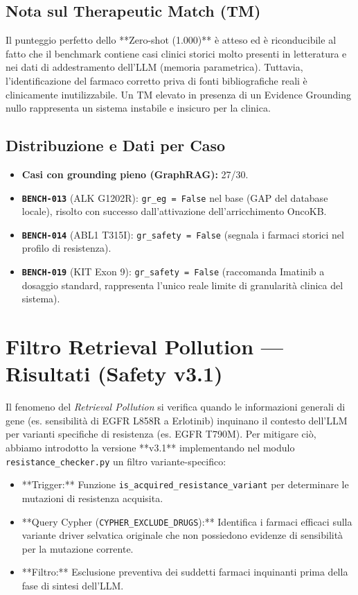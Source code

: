 \documentclass[12pt, a4paper]{article}
\newcommand{\bench}[1]{{\texttt{\textbf{#1}}}}
\begin{document}
\subsection{Nota sul Therapeutic Match (TM)}
Il punteggio perfetto dello **Zero-shot (1.000)** è atteso ed è riconducibile al fatto che il benchmark contiene casi clinici storici molto presenti in letteratura e nei dati di addestramento dell'LLM (memoria parametrica). Tuttavia, l'identificazione del farmaco corretto priva di fonti bibliografiche reali è clinicamente inutilizzabile. Un TM elevato in presenza di un Evidence Grounding nullo rappresenta un sistema instabile e insicuro per la clinica.

\subsection{Distribuzione e Dati per Caso}
\begin{itemize}[leftmargin=1.6em, itemsep=2pt]
  \item \textbf{Casi con grounding pieno (GraphRAG):} 27/30.
  \item \bench{BENCH-013} (ALK G1202R): \texttt{gr\_eg = False} nel base (GAP del database locale), risolto con successo dall'attivazione dell'arricchimento OncoKB.
  \item \bench{BENCH-014} (ABL1 T315I): \texttt{gr\_safety = False} (segnala i farmaci storici nel profilo di resistenza).
  \item \bench{BENCH-019} (KIT Exon 9): \texttt{gr\_safety = False} (raccomanda Imatinib a dosaggio standard, rappresenta l'unico reale limite di granularità clinica del sistema).
\end{itemize}

\section{Filtro Retrieval Pollution --- Risultati (Safety v3.1)}
Il fenomeno del \textit{Retrieval Pollution} si verifica quando le informazioni generali di gene (es. sensibilità di EGFR L858R a Erlotinib) inquinano il contesto dell'LLM per varianti specifiche di resistenza (es. EGFR T790M). Per mitigare ciò, abbiamo introdotto la versione **v3.1** implementando nel modulo \texttt{resistance\_checker.py} un filtro variante-specifico:
\begin{itemize}[leftmargin=1.6em, itemsep=2pt]
  \item **Trigger:** Funzione \texttt{is\_acquired\_resistance\_variant} per determinare le mutazioni di resistenza acquisita.
  \item **Query Cypher (\texttt{CYPHER\_EXCLUDE\_DRUGS}):** Identifica i farmaci efficaci sulla variante driver selvatica originale che non possiedono evidenze di sensibilità per la mutazione corrente.
  \item **Filtro:** Esclusione preventiva dei suddetti farmaci inquinanti prima della fase di sintesi dell'LLM.
\end{itemize}
\end{document}
